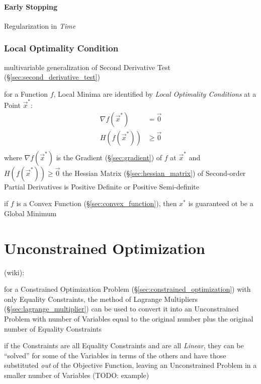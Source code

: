 \paragraph{Early Stopping}\label{sec:regularization}\hfill

Regularization in \emph{Time}



\subsubsection{Local Optimality Condition}\label{sec:local_optimality}


\fist multivariable generalization of Second Derivative Test
(\S\ref{sec:second_derivative_test})

for a Function $f$, Local Minima are identified by \emph{Local Optimality
  Conditions} at a Point $\vec{x}^*$:
\begin{align*}
  \nabla f(\vec{x}^*) & =    \vec{0} \\
  H(f(\vec{x}^*))     & \geq \vec{0} \\
\end{align*}
where $\nabla f(\vec{x}^*)$ is the Gradient (\S\ref{sec:gradient}) of $f$ at
$\vec{x}^*$ and $H(f(\vec{x}^*)) \geq \vec{0}$ the Hessian Matrix
(\S\ref{sec:hessian_matrix}) of Second-order Partial Derivatives is Positive
Definite or Positive Semi-definite

if $f$ is a Convex Function (\S\ref{sec:convex_function}), then $x^*$ is
guaranteed ot be a Global Minimum



\section{Unconstrained Optimization}\label{sec:unconstrained_optimization}

(wiki):

for a Constrained Optimization Problem (\S\ref{sec:constrained_optimization})
with only Equality Constraints, the method of Lagrange Multipliers
(\S\ref{sec:lagrange_multiplier}) can be used to convert it into an
Unconstrained Problem with number of Variables equal to the original number
plus the original number of Equality Constraints

if the Constraints are all Equality Constraints and are all \emph{Linear}, they
can be ``solved'' for some of the Variables in terms of the others and have
those substituted \emph{out} of the Objective Function, leaving an
Unconstrained Problem in a smaller number of Variables (TODO: example)

